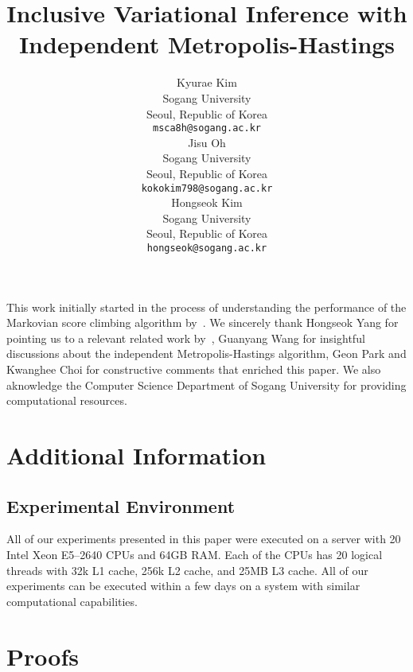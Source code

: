 \documentclass{article}
\title{Inclusive Variational Inference with \\ Independent Metropolis-Hastings}
\author{%
  Kyurae Kim \\
  Sogang University\\
  Seoul, Republic of Korea \\
  \texttt{msca8h@sogang.ac.kr} \\
  \And
  Jisu Oh \\
  Sogang University\\
  Seoul, Republic of Korea \\
  \texttt{kokokim798@sogang.ac.kr} \\
  \And
  Hongseok Kim \\
  Sogang University\\
  Seoul, Republic of Korea \\
  \texttt{hongseok@sogang.ac.kr} \\
}
\begin{document}
\maketitle

\begin{abstract}
  
\end{abstract}







\newpage

\begin{ack}
  This work initially started in the process of understanding the performance of the Markovian score climbing algorithm by~\citet{NEURIPS2020_b2070693}.
  We sincerely thank Hongseok Yang for pointing us to a relevant related work by~\citet{kim2021adaptive}, Guanyang Wang for insightful discussions about the independent Metropolis-Hastings algorithm, Geon Park and Kwanghee Choi for constructive comments that enriched this paper.
  We also aknowledge the Computer Science Department of Sogang University for providing computational resources.
\end{ack}




\newpage
\appendix
\section{Additional Information}
\subsection{Experimental Environment}\label{section:resources}
All of our experiments presented in this paper were executed on a server with 20 Intel Xeon E5--2640 CPUs and 64GB RAM.
Each of the CPUs has 20 logical threads with 32k L1 cache, 256k L2 cache, and 25MB L3 cache.
All of our experiments can be executed within a few days on a system with similar computational capabilities.





\section{Proofs}

\printProofs
\end{document}
